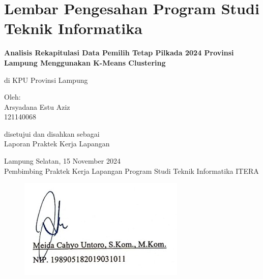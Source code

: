 
\section*{\centering \large Lembar Pengesahan Program Studi Teknik Informatika}

\setcounter{page}{2}

\begin{center}
\vspace{1cm}

\Large  %
\textbf{Analisis Rekapitulasi Data Pemilih Tetap Pilkada 2024 Provinsi Lampung Menggunakan K-Means Clustering}

\vspace{1cm}
\Large
di KPU Provinsi Lampung

\vspace{2cm}

\large  %
Oleh: \\
Arsyadana Estu Aziz  \\
121140068

\vspace{2cm}

\large  %
disetujui dan disahkan sebagai \\
Laporan Praktek Kerja Lapangan

\end{center}

\vfill

\noindent \normalsize  %
Lampung Selatan, 15 November 2024 \\
Pembimbing Praktek Kerja Lapangan Program Studi Teknik Informatika ITERA

\begin{figure}[b]
    \includegraphics[width=0.5\linewidth]{images/signature_meida.jpg}
    \label{fig:enter-label}
\end{figure}

